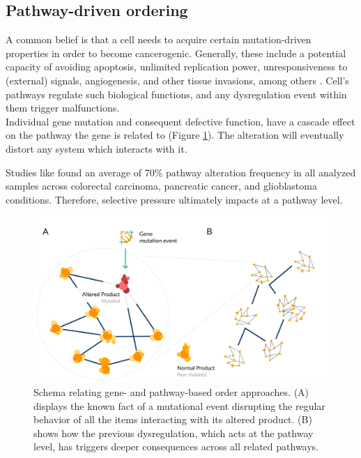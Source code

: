 \subsection{Pathway-driven ordering}
A common belief is that a cell needs to acquire certain mutation-driven properties in order to become cancerogenic. Generally, these include a potential capacity of avoiding apoptosis, unlimited replication power, unresponsiveness to (external) signals, angiogenesis, and other tissue invasions, among others \cite{Hanahan2011HallmarksGeneration}. Cell’s pathways regulate such biological functions, and any dysregulation event within them trigger malfunctions.
\\

Individual gene mutation and consequent defective function, have a cascade effect on the pathway the gene is related to (Figure \ref{fig:gp}). The alteration will eventually distort any system which interacts with it.

Studies like \cite{Gerstung2011TheTumorigenesis} found an average of 70\% pathway alteration frequency in all analyzed samples across colorectal carcinoma, pancreatic cancer, and glioblastoma conditions. Therefore, selective pressure ultimately impacts at a pathway level.
\\

\begin{figure}
    \centering
    \includegraphics[width=\linewidth]{images/GP.png}
    \caption{Schema relating gene- and pathway-based order approaches. (A) displays the known fact of a mutational event disrupting the regular behavior of all the items interacting with its altered product. (B) shows how the previous dysregulation, which acts at the pathway level, has triggers deeper consequences across all related pathways.}
    \label{fig:gp}
\end{figure}

